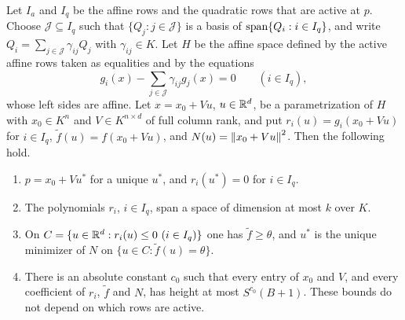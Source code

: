 \begin{lemma}
\label{lem:qc-restriction}
Let $I_a$ and $I_q$ be the affine rows and the quadratic rows that are active
at $p$. Choose $\mathcal J\subseteq I_q$ such that $\{Q_j:j\in\mathcal J\}$ is a
basis of $\operatorname{span}\{Q_i:i\in I_q\}$, and write $Q_i=\sum_{j\in\mathcal J}
\gamma_{ij}Q_j$ with $\gamma_{ij}\in K$. Let $H$ be the affine space defined
by the active affine rows taken as equalities and by the equations
\begin{equation}
\label{eq:qc-differences}
g_i(x)-\sum_{j\in\mathcal J}\gamma_{ij}g_j(x)=0\qquad(i\in I_q),
\end{equation}
whose left sides are affine. Let $x=x_0+Vu$, $u\in\mathbb R^d$, be a parametrization
of $H$ with $x_0\in K^n$ and $V\in K^{n\times d}$ of full column rank, and put
$r_i(u)=g_i(x_0+Vu)$ for $i\in I_q$, $\tilde f(u)=f(x_0+Vu)$, and
$N(u)=\left\lVert x_0+Vu\right\rVert^2$. Then the following hold.
\begin{enumerate}[label=(\alph*),leftmargin=*]
\item $p=x_0+Vu^*$ for a unique $u^*$, and $r_i(u^*)=0$ for $i\in I_q$.
\item The polynomials $r_i$, $i\in I_q$, span a space of dimension at most
$k$ over $K$.
\item On $C=\{u\in\mathbb R^d:r_i(u)\le0\ (i\in I_q)\}$ one has $\tilde f\ge\theta$,
and $u^*$ is the unique minimizer of $N$ on $\{u\in C:\tilde f(u)=\theta\}$.
\item There is an absolute constant $c_0$ such that every entry of $x_0$ and
$V$, and every coefficient of $r_i$, $\tilde f$ and $N$, has height at most
$S^{c_0}(B+1)$. These bounds do not depend on which rows are active.
\end{enumerate}
\end{lemma}

